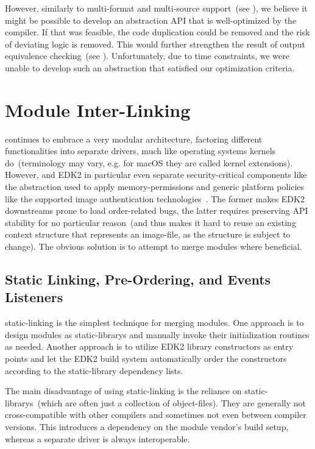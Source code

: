 However, similarly to multi-format and multi-source support~(see ), we believe it might be possible to develop an abstraction \gls{API} that is well-optimized by the compiler. If that was feasible, the code duplication could be removed and the risk of deviating logic is removed. This would further strengthen the result of output equivalence checking~(see ). Unfortunately, due to time constraints, we were unable to develop such an abstraction that satisfied our optimization criteria.

\section{Module Inter-Linking}

 continues to embrace a very modular architecture, factoring different functionalities into separate drivers, much like operating systems kernels do~(terminology may vary, e.g. for macOS they are called kernel extensions). However,  and \gls{EDK2} in particular even separate security-critical components like the  abstraction used to apply \gls{memory-permissions} and generic platform policies like the supported \gls{image} authentication technologies~\cite{pi-spec,edk2}. The former makes \gls{EDK2} downstreams prone to load order-related bugs, the latter requires preserving \gls{API} stability for no particular reason~(and thus makes it hard to reuse an existing context structure that represents an \gls{image-file}, as the structure is subject to change). The obvious solution is to attempt to merge modules where beneficial.

\subsection{Static Linking, Pre-Ordering, and Events Listeners}

\Gls{static-linking} is the simplest technique for merging modules. One approach is to design modules as \glspl{static-library} and manually invoke their initialization routines as needed. Another approach is to utilize \gls{EDK2} library constructors as entry points and let the \gls{EDK2} build system automatically order the constructors according to the \gls{static-library} dependency lists.

The main disadvantage of using \gls{static-linking} is the reliance on \glspl{static-library}~(which are often just a collection of \glspl{object-file}). They are generally not cross-compatible with other compilers and sometimes not even between compiler versions. This introduces a dependency on the module vendor's build setup, whereas a separate driver is always interoperable.

